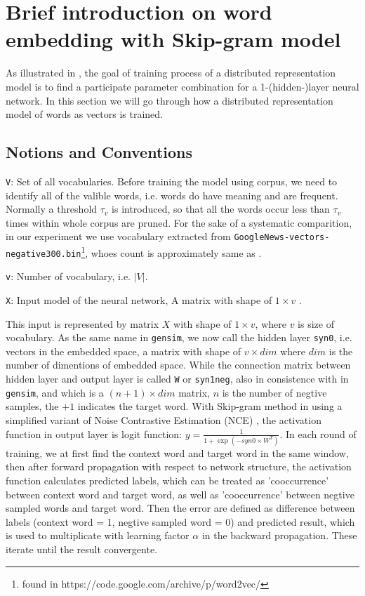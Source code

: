 \documentclass[11pt,a4paper]{article}
\begin{document}
\section{Brief introduction on word embedding with Skip-gram model}
As illustrated in \cite{mikolov2013distributed}, the goal of training process of a distributed representation model is to find a participate parameter combination for a 1-(hidden-)layer neural network. In this section we will go through how a distributed representation model of words as vectors is trained.

  \subsection{Notions and Conventions}
  \verb|V|: Set of all vocabularies. Before training the model using corpus, we need to identify all of the valible words, i.e. words do have meaning and are frequent. Normally a threshold $\tau_v$ is introduced, so that all the words occur less than $\tau_v$ times within whole corpus are pruned. For the sake of a systematic comparition, in our experiment we use vocabulary extracted from \verb|GoogleNews-vectors-negative300.bin|\footnote{found in https://code.google.com/archive/p/word2vec/}, whoes count is approximately same as \cite{levy2015improving}.

  \verb|v|: Number of vocabulary, i.e. $|V|$.

  \verb|X|: Input model of the neural network, A matrix with shape of $1 \times v$ .

This input is represented by matrix $X$ with shape of $1\times v$, where $v$ is size of vocabulary. As the same name in \verb|gensim|, we now call the hidden layer \verb|syn0|, i.e. vectors in the embedded space, a matrix with shape of $v\times dim$ where $dim$ is the number of dimentions of embedded space. While the connection matrix between hidden layer and output layer is called \verb|W| or \verb|syn1neg|, also in consistence with in \verb|gensim|, and which is a $(n+1)\times dim$ matrix, $n$ is the number of negtive samples, the $+1$ indicates the target word. With Skip-gram method in \cite{mikolov2013distributed} using a simplified variant of Noise Contrastive Estimation (NCE) \cite{gutmann2012noise}, the activation function in output layer is logit function: $y=\frac{1}{1+\exp(-syn0\times W^T)}$. In each round of training, we at first find the context word and target word in the same window, then after forward propagation with respect to network structure, the activation function calculates predicted labels, which can be treated as 'cooccurrence' between context word and target word, as well as 'cooccurrence' between negtive sampled words and target word. Then the error are defined as difference between labels (context word = 1, negtive sampled word = 0) and predicted result, which is used to multiplicate with learning factor $\alpha$ in the backward propagation. These iterate until the result convergente.
\end{document}
